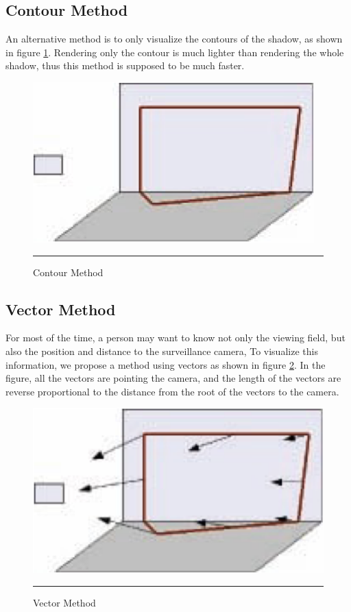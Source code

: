 \subsection{Contour Method}

An alternative method is to only visualize the contours of the shadow, as shown in figure \ref{fig:ContourMethod}. Rendering only the contour is much lighter than rendering the whole shadow, thus this method is supposed to be much faster.

\begin{figure}[htbp]
	\centering
	\includegraphics{./Primitives/theory_contour.png}
	\rule{35em}{0.5pt}
	\caption[Contour Method]{Contour Method}
	\label{fig:ContourMethod}
\end{figure}

\subsection{Vector Method}

For most of the time, a person may want to know not only the viewing field, but also the position and distance to the surveillance camera, To visualize this information, we propose a method using vectors as shown in figure \ref{fig:VectorMethod}. In the figure, all the vectors are pointing the camera, and the length of the vectors are reverse proportional to the distance from the root of the vectors to the camera.

\begin{figure}[htbp]
	\centering
	\includegraphics{./Primitives/theory_vector.png}
	\rule{35em}{0.5pt}
	\caption[Vector Method]{Vector Method}
	\label{fig:VectorMethod}
\end{figure}

